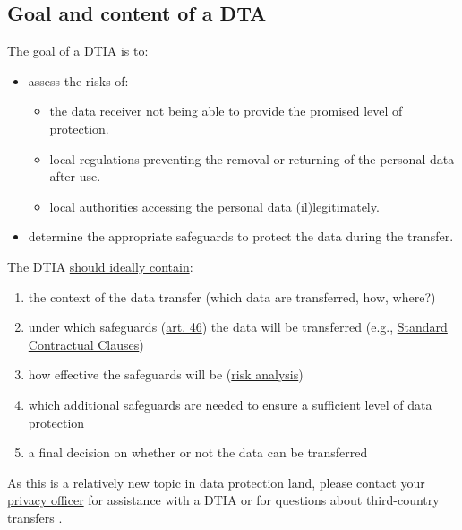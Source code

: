 \documentclass[
]{book}
\providecommand{\tightlist}{%
  \setlength{\itemsep}{0pt}\setlength{\parskip}{0pt}}
\begin{document}
\hypertarget{dtia-goal-content}{%
\subsection{Goal and content of a DTA}\label{dtia-goal-content}}

The goal of a DTIA is to:

\begin{itemize}
\tightlist
\item
  assess the risks of:

  \begin{itemize}
  \tightlist
  \item
    the data receiver not being able to provide the promised level of protection.
  \item
    local regulations preventing the removal or returning of the personal data after use.
  \item
    local authorities accessing the personal data (il)legitimately.
  \end{itemize}
\item
  determine the appropriate safeguards to protect the data during the transfer.
\end{itemize}

The DTIA \href{https://edpb.europa.eu/system/files/2021-06/edpb_recommendations_202001vo.2.0_supplementarymeasurestransferstools_en.pdf}{should ideally contain}:

\begin{enumerate}
\def\labelenumi{\arabic{enumi}.}
\tightlist
\item
  the context of the data transfer (which data are transferred, how, where?)
\item
  under which safeguards (\href{https://gdpr-info.eu/art-46-gdpr/}{art. 46})
  the data will be transferred (e.g., \protect\hyperlink{scc}{Standard Contractual Clauses})
\item
  how effective the safeguards will be (\protect\hyperlink{risk-assessment}{risk analysis})
\item
  which additional safeguards are needed to ensure a sufficient level of data protection
\item
  a final decision on whether or not the data can be transferred
\end{enumerate}

As this is a relatively new topic in data protection land, please contact your
\protect\hyperlink{support}{privacy officer}
for assistance with a DTIA or for questions about third-country transfers .
\end{document}
